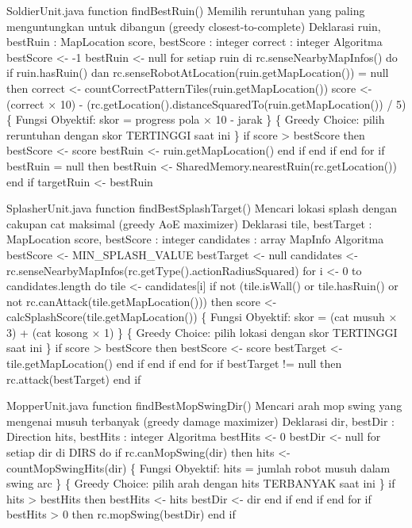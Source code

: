 \begin{pseudocode}{SoldierUnit.java}
function findBestRuin()
{ Memilih reruntuhan yang paling menguntungkan untuk dibangun (greedy closest-to-complete) }
{ Deklarasi }
ruin, bestRuin : MapLocation
score, bestScore : integer
correct : integer
{ Algoritma }
bestScore <- -1
bestRuin <- null
for setiap ruin di rc.senseNearbyMapInfos() do
    if ruin.hasRuin() dan rc.senseRobotAtLocation(ruin.getMapLocation()) = null then
        correct <- countCorrectPatternTiles(ruin.getMapLocation())
        score <- (correct × 10) - (rc.getLocation().distanceSquaredTo(ruin.getMapLocation()) / 5)
        \{ Fungsi Obyektif: skor = progress pola × 10 - jarak \}
        \{ Greedy Choice: pilih reruntuhan dengan skor TERTINGGI saat ini \}
        if score > bestScore then
            bestScore <- score
            bestRuin <- ruin.getMapLocation()
        end if
    end if
end for
if bestRuin = null then
    bestRuin <- SharedMemory.nearestRuin(rc.getLocation())
end if
targetRuin <- bestRuin
\end{pseudocode}

\begin{pseudocode}{SplasherUnit.java}
function findBestSplashTarget()
{ Mencari lokasi splash dengan cakupan cat maksimal (greedy AoE maximizer) }
{ Deklarasi }
tile, bestTarget : MapLocation
score, bestScore : integer
candidates : array MapInfo
{ Algoritma }
bestScore <- MIN_SPLASH_VALUE
bestTarget <- null
candidates <- rc.senseNearbyMapInfos(rc.getType().actionRadiusSquared)
for i <- 0 to candidates.length do
    tile <- candidates[i]
    if not (tile.isWall() or tile.hasRuin() or not rc.canAttack(tile.getMapLocation())) then
        score <- calcSplashScore(tile.getMapLocation())
        \{ Fungsi Obyektif: skor = (cat musuh × 3) + (cat kosong × 1) \}
        \{ Greedy Choice: pilih lokasi dengan skor TERTINGGI saat ini \}
        if score > bestScore then
            bestScore <- score
            bestTarget <- tile.getMapLocation()
        end if
    end if
end for
if bestTarget != null then
    rc.attack(bestTarget)
end if
\end{pseudocode}

\begin{pseudocode}{MopperUnit.java}
function findBestMopSwingDir()
{ Mencari arah mop swing yang mengenai musuh terbanyak (greedy damage maximizer) }
{ Deklarasi }
dir, bestDir : Direction
hits, bestHits : integer
{ Algoritma }
bestHits <- 0
bestDir <- null
for setiap dir di DIRS do
    if rc.canMopSwing(dir) then
        hits <- countMopSwingHits(dir)
        \{ Fungsi Obyektif: hits = jumlah robot musuh dalam swing arc \}
        \{ Greedy Choice: pilih arah dengan hits TERBANYAK saat ini \}
        if hits > bestHits then
            bestHits <- hits
            bestDir <- dir
        end if
    end if
end for
if bestHits > 0 then
    rc.mopSwing(bestDir)
end if
\end{pseudocode}

